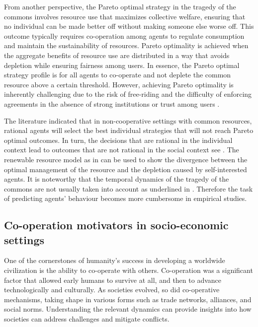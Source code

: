 \documentclass[pdflatex,sn-basic,lineno]{sn-jnl}
\theoremstyle{thmstyleone}%
\theoremstyle{thmstyletwo}%
\theoremstyle{thmstylethree}%
\begin{document}
From another perspective, the Pareto optimal strategy in the tragedy of the commons involves resource use that
maximizes collective welfare, ensuring that no individual can be made better off without making someone else worse
off. This outcome typically requires co-operation among agents to regulate consumption and maintain the sustainability
of resources. Pareto optimality is achieved when the aggregate benefits of resource use are distributed in a way that
avoids depletion while ensuring fairness among users. In essence, the Pareto optimal strategy profile is for all
agents to co-operate and not deplete the common resource above a certain threshold. However, achieving Pareto
optimality is inherently challenging due to the risk of free-riding and the difficulty of enforcing agreements in the
absence of strong institutions or trust among users \cite{Ostrom1990}.

The literature indicated that in non-cooperative settings with common resources, rational agents will select the best
individual strategies that will not reach Pareto optimal outcomes. In turn, the decisions that are rational in the
individual context lead to outcomes that are not rational in the social context see \citep{Maldonado2016}. The
renewable resource model as in \cite{clark1974mathematical} can be used to show the divergence between the optimal
management of the resource and the depletion caused by self-interested agents. It is noteworthy that the temporal
dynamics of the tragedy of the commons are not usually taken into account as underlined in \cite{brekke2007effect}.
Therefore the task of predicting agents’ behaviour becomes more cumbersome in empirical studies.

\subsection{Co-operation motivators in socio-economic settings}\label{subsec2-2}

One of the cornerstones of humanity’s success in developing a worldwide civilization is the ability to co-operate with
others. Co-operation was a significant factor that allowed early humans to survive at all, and then to advance
technologically and culturally. As societies evolved, so did co-operative mechanisms, taking shape in various forms such
as trade networks, alliances, and social norms. Understanding the relevant dynamics can provide insights into how
societies can address challenges and mitigate conflicts.
\end{document}
